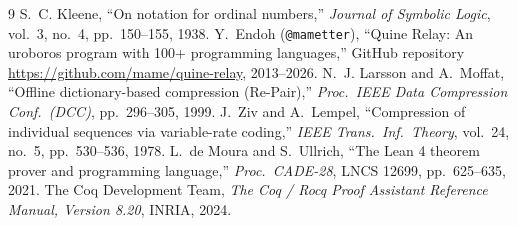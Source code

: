 \documentclass[10pt,twocolumn]{article}
\theoremstyle{definition}
\begin{document}
\footnotesize
\begin{thebibliography}{9}
\setlength{\itemsep}{1pt}
\setlength{\parskip}{0pt}
S.~C. Kleene, ``On notation for ordinal numbers,'' \emph{Journal of Symbolic Logic}, vol.~3, no.~4, pp.~150--155, 1938.
Y.~Endoh (\texttt{@mametter}), ``Quine Relay: An uroboros program with 100+ programming languages,'' GitHub repository \url{https://github.com/mame/quine-relay}, 2013--2026.
N.~J. Larsson and A.~Moffat, ``Offline dictionary-based compression (Re-Pair),'' \emph{Proc.\ IEEE Data Compression Conf.\ (DCC)}, pp.~296--305, 1999.
J.~Ziv and A.~Lempel, ``Compression of individual sequences via variable-rate coding,'' \emph{IEEE Trans.\ Inf.\ Theory}, vol.~24, no.~5, pp.~530--536, 1978.
L.~de Moura and S.~Ullrich, ``The Lean 4 theorem prover and programming language,'' \emph{Proc.\ CADE-28}, LNCS 12699, pp.~625--635, 2021.
The Coq Development Team, \emph{The Coq / Rocq Proof Assistant Reference Manual, Version 8.20}, INRIA, 2024.
\end{thebibliography}
\end{document}
